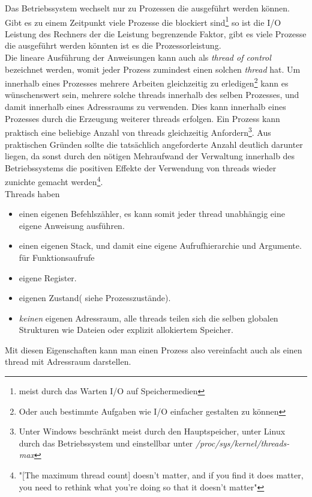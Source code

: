 Das Betriebssystem wechselt nur zu Prozessen die ausgeführt werden können. Gibt es zu einem Zeitpunkt viele Prozesse die blockiert sind\footnote{meist durch das Warten I/O auf Speichermedien} so ist die I/O Leistung des Rechners der die Leistung begrenzende Faktor, gibt es viele Prozesse die ausgeführt werden könnten ist es die Prozessorleistung.
\\Die lineare Ausführung der Anweisungen kann auch als \emph{thread of control} bezeichnet werden, womit jeder Prozess zumindest einen solchen \emph{thread} hat. Um innerhalb eines Prozesses mehrere Arbeiten gleichzeitig zu erledigen\footnote{Oder auch bestimmte Aufgaben wie I/O einfacher gestalten zu können} kann es wünschenswert sein, mehrere solche threads innerhalb des selben Prozesses, und damit innerhalb eines Adressraums zu verwenden. Dies kann innerhalb eines Prozesses durch die Erzeugung weiterer threads erfolgen. Ein Prozess kann praktisch eine beliebige Anzahl von threads gleichzeitig Anfordern\footnote{Unter Windows beschränkt meist durch den Hauptspeicher, unter Linux durch das Betriebssystem und einstellbar unter \textit{/proc/sys/kernel/threads-max}}. Aus praktischen Gründen sollte die tatsächlich angeforderte Anzahl deutlich darunter liegen, da sonst durch den nötigen Mehraufwand der Verwaltung innerhalb des Betriebssystems die positiven Effekte der Verwendung von threads wieder zunichte gemacht werden\footnote{"[The maximum thread count] doesn't matter, and if you find it does matter, you need to rethink what you're doing so that it doesn't matter"\cite{stacko_threadcount}}.
\\Threads haben \cite[S. 148]{tanenbaum2016}
\begin{itemize}
	\item einen eigenen Befehlszähler, es kann somit jeder thread unabhängig eine eigene Anweisung ausführen.
	\item einen eigenen Stack, und damit eine eigene Aufrufhierarchie und Argumente. für Funktionsaufrufe
	\item eigene Register.
	\item eigenen Zustand( siehe Prozesszustände).
	\item \emph{keinen} eigenen Adressraum, alle threads teilen sich die selben globalen Strukturen wie Dateien oder explizit allokiertem Speicher.
\end{itemize}	
Mit diesen Eigenschaften kann man einen Prozess also vereinfacht auch als einen thread mit Adressraum darstellen.\cite[S. 1]{butenhof1997}
